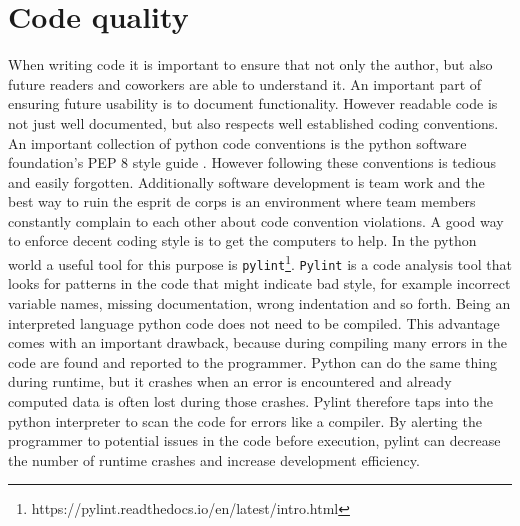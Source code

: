 \section{Code quality}
When writing code it is important to ensure that not only the author, but also future readers and coworkers are able to understand it. An important part of ensuring future usability is to document functionality. However readable code is not just well documented, but also respects well established coding conventions. An important collection of python code conventions is the python software foundation's PEP 8 style guide \cite{VanRossum2001}. However following these conventions is tedious and easily forgotten. Additionally software development is team work and the best way to ruin the esprit de corps is an environment where team members constantly complain to each other about code convention violations.
A good way to enforce decent coding style is to get the computers to help. In the python world a useful tool for this purpose is \texttt{pylint}\footnote{https://pylint.readthedocs.io/en/latest/intro.html}. \texttt{Pylint} is a code analysis tool that looks for patterns in the code that might indicate bad style, for example incorrect variable names, missing documentation, wrong indentation and so forth. 
Being an interpreted language python code does not need to be compiled. This advantage comes with an important drawback, because during compiling many errors in the code are found and reported to the programmer. Python can do the same thing during runtime, but it crashes when an error is encountered and already computed data is often lost during those crashes. Pylint therefore taps into the python interpreter to scan the code for errors like a compiler. By alerting the programmer to potential issues in the code before execution, pylint can decrease the number of runtime crashes and increase development efficiency.    

